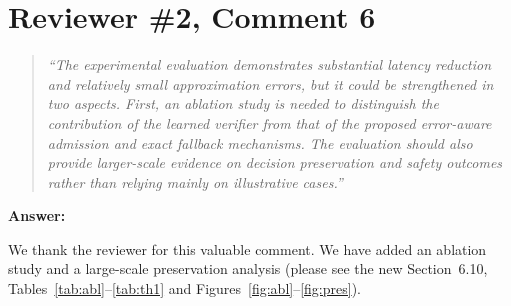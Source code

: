 \documentclass[11pt]{article}
\newenvironment{revcomment}{\begin{quote}\itshape}{\end{quote}}
\newcommand{\answerhead}[1]{\par\medskip\noindent\textbf{#1}\par}
\begin{document}
\section*{Reviewer \#2, Comment 6}
\begin{revcomment}
``The experimental evaluation demonstrates substantial latency reduction and relatively small approximation errors, but it could
be strengthened in two aspects. First, an ablation study is needed to distinguish the contribution of the learned verifier from
that of the proposed error-aware admission and exact fallback mechanisms. The evaluation should also provide larger-scale
evidence on decision preservation and safety outcomes rather than relying mainly on illustrative cases.''
\end{revcomment}
\answerhead{Answer:}
We thank the reviewer for this valuable comment. We have added an ablation study and a large-scale preservation analysis
(please see the new Section~6.10, Tables~\ref{tab:abl}--\ref{tab:th1} and Figures~\ref{fig:abl}--\ref{fig:pres}).
\end{document}
